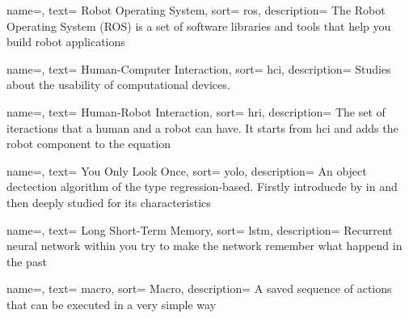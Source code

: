 {
  name=,
  text= Robot Operating System,
  sort= ros,
  description= {The Robot Operating System (ROS) is a set of software libraries and tools that help you build robot applications~\cite{site:ros}}
}

{
  name=,
  text= Human-Computer Interaction,
  sort= hci,
  description= {Studies about the usability of computational devices.}
}

{
  name=,
  text= Human-Robot Interaction,
  sort= hri,
  description= {The set of iteractions that a human and a robot can have. It starts from \gls{hci} and adds the robot component to the equation}
}

{
  name=,
  text= You Only Look Once,
  sort= yolo,
  description= {An object dectection algorithm of the type regression-based. Firstly introducde by \citeauthor{article:yolov1}\cite{article:yolov1} in \citeyear{article:yolov1} and then deeply studied for its characteristics}
}

{
  name=,
  text= Long Short-Term Memory,
  sort= lstm,
  description= {Recurrent neural network within you try to make the network remember what happend in the past}
}


{
  name=,
  text= macro,
  sort= Macro,
  description= {A saved sequence of actions that can be executed in a very simple way}
}




